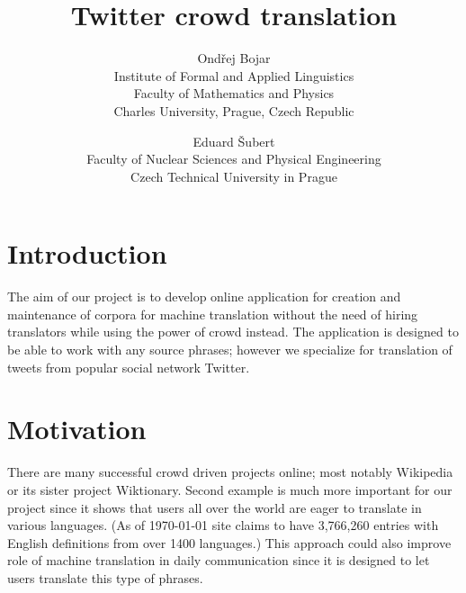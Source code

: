 \setlength{\topmargin}{-.5in}
\setlength{\textheight}{9in}
\setlength{\oddsidemargin}{.125in}
\setlength{\textwidth}{6.25in}

\title{\textbf{Twitter crowd translation}}
\author{Ond\v{r}ej Bojar\\
Institute of Formal and Applied Linguistics\\
Faculty of Mathematics and Physics\\
Charles University, Prague, Czech Republic
\and
Eduard \v{S}ubert\\
Faculty of Nuclear Sciences and Physical Engineering\\
Czech Technical University in Prague}


\def\footurl#1{\footnote{\tt{} #1}}
\def\equo#1{``#1''}

\maketitle
%
\section{Introduction}
The aim of our project is to develop online application for creation and maintenance of corpora for machine translation without the need of hiring translators while using the power of crowd instead. The application is designed to be able to work with any source phrases; however we specialize for translation of tweets from popular social network Twitter.

%
\section{Motivation}
There are many successful crowd driven projects online; most notably Wikipedia or its sister project Wiktionary. Second example is much more important for our project since it shows that users all over the world are eager to translate in various languages. (As of \today{ }site claims to have 3,766,260 entries with English definitions from over 1400 languages.) This approach could also improve role of machine translation in daily communication since it is designed to let users translate this type of phrases.
%
